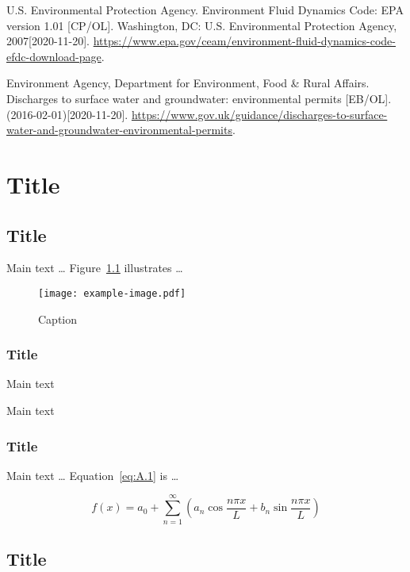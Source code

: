\documentclass[degree=doctor,language=english]{sysuthesis}
\begin{document}
\begin{thebibliography}{9}
   U.S. Environmental Protection Agency. Environment Fluid Dynamics Code: EPA version 1.01 [CP/OL]. Washington, DC: U.S. Environmental Protection Agency, 2007[2020-11-20]. \url{https://www.epa.gov/ceam/environment-fluid-dynamics-code-efdc-download-page}.

   Environment Agency, Department for Environment, Food \& Rural Affairs. Discharges to surface water and groundwater: environmental permits [EB/OL]. (2016-02-01)[2020-11-20]. \url{https://www.gov.uk/guidance/discharges-to-surface-water-and-groundwater-environmental-permits}.

\end{thebibliography}


\appendix

\chapter{Title}

\section{Title}

Main text … Figure~\ref{fig:A.1} illustrates …

\begin{figure}
  \centering
  \texttt{[image: example-image.pdf]}
  \caption{Caption}
  \label{fig:A.1}
\end{figure}

\subsection{Title}

Main text

Main text

\subsection{Title}

Main text … Equation~\eqref{eq:A.1} is …

\begin{equation}
  f(x) = a_0 + \sum_{n=1}^\infty \left( a_n \cos⁡ \frac{n \pi x}{L}
    + b_n \sin⁡ \frac{n \pi x}{L} \right)
  \label{eq:A.1}
\end{equation}

\section{Title}
\end{document}
